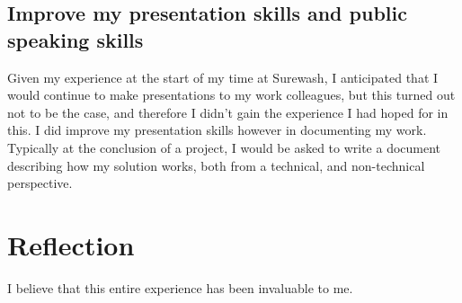     \subsection{Improve my presentation skills and public speaking skills} Given my experience at the start of my time at Surewash, I anticipated that I would continue to make presentations to my work colleagues, but this turned out not to be the case, and therefore I didn't gain the experience I had hoped for in this. I did improve my presentation skills however in documenting my work. Typically at the conclusion of a project, I would be asked to write a document describing how my solution works, both from a technical, and non-technical perspective.

\section{Reflection}
I believe that this entire experience has been invaluable to me.